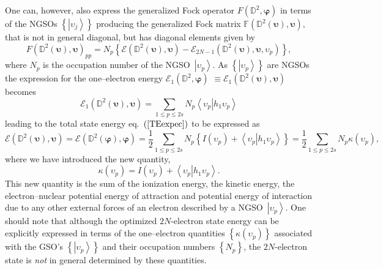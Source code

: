 \documentclass[aps,preprint]{revtex4}%
\begin{document}
One can, however, also express the generalized Fock operator $F\left(
\mathbb{D}^{2},\bm{\varphi}\right)  $ in terms of the NGSOs $\left\{
\left\vert \upsilon_{j}\right\rangle \right\}  $ producing the generalized
Fock matrix $\mathbb{F}\left(  \mathbb{D}^{2}\left(  \bm{\upsilon}\right)
,\bm{\upsilon}\right)  ,$ that is not in general diagonal, but has diagonal
elements given by
\begin{equation}
F\left(  \mathbb{D}^{2}\left(  \bm{\upsilon}\right)  ,\bm{\upsilon }\right)
_{pp}=N_{p}\left\{  \mathcal{E}\left(  \mathbb{D}^{2}\left(
\bm{\upsilon}\right)  ,\bm{\upsilon}\right)  -\mathcal{E}_{2N-1}\left(
\mathbb{D}^{2}\left(  \bm{\upsilon}\right)  ,\bm{\upsilon,}\upsilon
_{p}\right)  \right\}  ,
\end{equation}
where $N_{p}$ is the occupation number of the NGSO\ $\left\vert \upsilon
_{p}\right\rangle $. As $\left\{  \left\vert \upsilon_{p}\right\rangle
\right\}  $ are NGSOs the expression for the one--electron energy
$\mathcal{E}_{1}\left(  \mathbb{D}^{2},\bm{\varphi}\right)  $ $\equiv
\mathcal{E}_{1}\left(  \mathbb{D}^{2}\left(  \bm{\upsilon}\right)
,\bm{\upsilon}\right)  $ becomes%
\begin{equation}
\mathcal{E}_{1}\left(  \mathbb{D}^{2}\left(  \bm{\upsilon}\right)
,\bm{\upsilon}\right)  =\sum_{1\leq p\leq2s}N_{p}\left\langle \left.
\upsilon_{p}\right\vert h_{1}\upsilon_{p}\right\rangle
\end{equation}
leading to the total state energy eq.\ $\left(  \ref{TEexpec}\right)  $ to be
expressed as
\begin{equation}
\mathcal{E}\left(  \mathbb{D}^{2}\left(  \bm{\upsilon}\right)
,\bm{\upsilon}\right)  =\mathcal{E}\left(  \mathbb{D}^{2}\left(
\bm{\varphi}\right)  ,\bm{\varphi}\right)  =\frac{1}{2}\sum_{1\leq p\leq
2s}N_{p}\left\{  I\left(  \upsilon_{p}\right)  +\left\langle \left.
\upsilon_{p}\right\vert h_{1}\upsilon_{p}\right\rangle \right\}  =\frac{1}{2}%
{\textstyle\sum\limits_{1\leq p\leq2s}}
N_{p}\kappa\left(  \upsilon_{p}\right)  , \label{Enkappa}%
\end{equation}
where we have introduced the new quantity,
\begin{equation}
\kappa\left(  \upsilon_{p}\right)  =I\left(  \upsilon_{p}\right)
+\left\langle \left.  \upsilon_{p}\right\vert h_{1}\upsilon_{p}\right\rangle .
\label{kappa}%
\end{equation}
This new quantity is the sum of the ionization energy, the kinetic energy, the
electron--nuclear potential energy of attraction and potential energy of
interaction due to any other external forces of an electron described by a
NGSO\ $\left\vert \upsilon_{p}\right\rangle $. One should note that although
the optimized $2N$-electron state energy can be explicitly expressed in terms
of the one--electron quantities $\left\{  \kappa\left(  \upsilon_{p}\right)
\right\}  $ associated with the GSO's $\left\{  \left\vert \upsilon
_{p}\right\rangle \right\}  $ and their occupation numbers $\left\{
N_{p}\right\}  $, the $2N$-electron state is \emph{not }in general determined
by these quantities.
\end{document}
